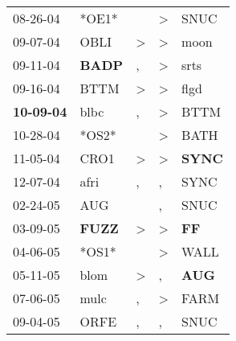 \begin{supertabular}{p{0.07\textwidth}p{0.06\textwidth}p{0.02\textwidth}p{0.02\textwidth}p{0.06\textwidth}}
          08-26-04\textsuperscript{} &                            *OE1* &                  &     \textgreater &           SNUC\textsuperscript{} \\
          09-07-04\textsuperscript{} &           OBLI\textsuperscript{} &     \textgreater &     \textgreater &           moon\textsuperscript{} \\
          09-11-04\textsuperscript{} &  \textbf{BADP\textsuperscript{}} &                , &     \textgreater &           srts\textsuperscript{} \\
          09-16-04\textsuperscript{} &           BTTM\textsuperscript{} &     \textgreater &     \textgreater &           flgd\textsuperscript{} \\
 \textbf{10-09-04\textsuperscript{}} &           blbc\textsuperscript{} &                , &     \textgreater &           BTTM\textsuperscript{} \\
          10-28-04\textsuperscript{} &                            *OS2* &                  &     \textgreater &           BATH\textsuperscript{} \\
          11-05-04\textsuperscript{} &           CRO1\textsuperscript{} &     \textgreater &     \textgreater &  \textbf{SYNC\textsuperscript{}} \\
          12-07-04\textsuperscript{} &           afri\textsuperscript{} &                , &                , &           SYNC\textsuperscript{} \\
          02-24-05\textsuperscript{} &            AUG\textsuperscript{} &                  &                , &           SNUC\textsuperscript{} \\
          03-09-05\textsuperscript{} &  \textbf{FUZZ\textsuperscript{}} &     \textgreater &     \textgreater &    \textbf{FF\textsuperscript{}} \\
          04-06-05\textsuperscript{} &                            *OS1* &                  &     \textgreater &           WALL\textsuperscript{} \\
          05-11-05\textsuperscript{} &           blom\textsuperscript{} &     \textgreater &                , &   \textbf{AUG\textsuperscript{}} \\
          07-06-05\textsuperscript{} &           mulc\textsuperscript{} &                , &     \textgreater &           FARM\textsuperscript{} \\
          09-04-05\textsuperscript{} &           ORFE\textsuperscript{} &                , &                , &           SNUC\textsuperscript{} \\

\end{supertabular}
